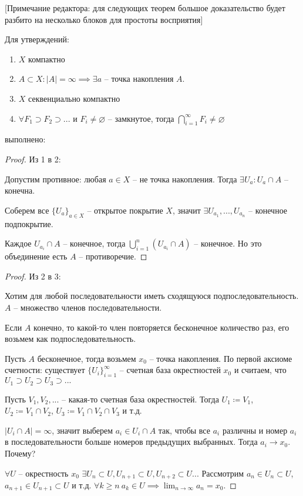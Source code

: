 \documentclass[main]{subfiles}
\begin{document}
[Примечание редактора: для следующих теорем большое доказательство будет разбито на несколько блоков для простоты восприятия]
\begin{theorem}\label{axOfCount:compactRel}
    Для утверждений:
    \begin{enumerate}
        \item $X$ компактно
        \item $A \subset X: |A| = \infty \implies \exists a$ -- точка накопления $A$.
        \item $X$ секвенциально компактно
        \item $\forall F_1 \supset F_2 \supset ...$ и $F_i \neq \varnothing$ -- замкнутое, тогда $\bigcap_{i = 1}^\infty F_i \neq \varnothing$
    \end{enumerate}
    выполнено:
    \begin{center}
        
    \end{center}
\end{theorem}
\begin{proof}
    Из 1 в 2:

    Допустим противное: любая $a \in X$ -- не точка накопления.
    Тогда $\exists U_a: U_a \cap A$ -- конечна.

    Соберем все $\{U_a\}_{a \in X}$ -- открытое покрытие $X$,
    значит $\exists U_{a_1},..., U_{a_n}$ -- конечное подпокрытие.

    Каждое $U_{a_i} \cap A$ -- конечное, тогда $\bigcup_{i=1}^n (U_{a_i} \cap A)$ -- конечное.
    Но это объединение есть $A$ -- противоречие.
\end{proof}
\begin{proof}
    Из 2 в 3:

    Хотим для любой последовательности иметь сходящуюся подпоследовательность.
    $A$ -- множество членов последовательности.

    Если $A$ конечно, то какой-то член повторяется бесконечное количество раз, его возьмем как подпоследовательность.

    Пусть $A$ бесконечное, тогда возьмем $x_0$ -- точка накопления.
    По первой аксиоме счетности: существует $\{U_i\}_{i=1}^\infty$ -- счетная база окрестностей $x_0$ и считаем, что $U_1 \supset U_2 \supset U_3 \supset ...$

    Пусть $V_1, V_2, ...$ -- какая-то счетная база окрестностей.
    Тогда $U_1 \coloneqq V_1$, $U_2 \coloneqq V_1 \cap V_2$, $U_3 \coloneqq V_1 \cap V_2 \cap V_3$ и т.д.

    $|U_i \cap A| = \infty$, значит выберем $a_i \in U_i \cap A$ так, чтобы все $a_i$ различны и номер $a_i$ в последовательности больше номеров предыдущих выбранных.
    Тогда $a_i \to x_0$. Почему?

    $\forall U$ -- окрестность $x_0$ $\exists U_n \subset U, U_{n+1} \subset U, U_{n+2} \subset U...$
    Рассмотрим $a_n \in U_n \subset U$, $a_{n+1} \in U_{n+1} \subset U$ и т.д.
    $\forall k\ge n\ a_k \in U \implies \lim_{n \to \infty} a_n = x_0$.
\end{proof}
\end{document}
